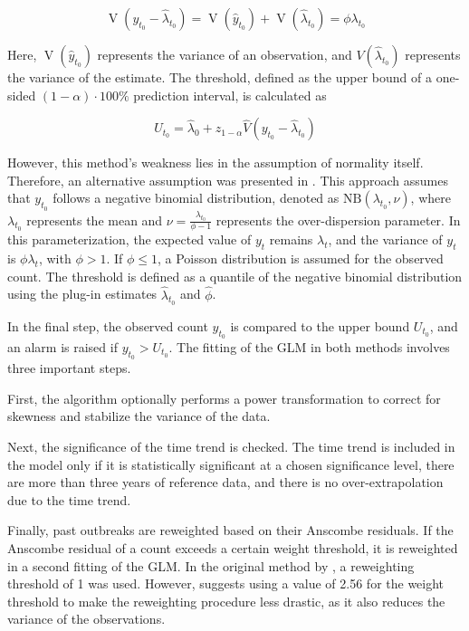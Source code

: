 \documentclass[a4paper,twoside,11pt]{report} %
\DeclareMathOperator{\V}{V}
\theoremstyle{definition}
\theoremstyle{definition}
\theoremstyle{definition}
\theoremstyle{definition}
\theoremstyle{remark}
\begin{document}
\begin{equation}
\V(y_{t_0}-\hat{\lambda}_{t_0}) = \V(\hat{y}_{t_0}) + \V(\hat{\lambda}_{t_0}) = \phi\lambda_{t_0}
\end{equation}

Here, \(\V(\hat{y}_{t_0})\) represents the variance of an observation, and \(V(\hat{\lambda}_{t_0})\) represents the variance of the estimate. The threshold, defined as the upper bound of a one-sided \((1-\alpha)\cdot100\%\) prediction interval, is calculated as

\begin{equation}
U_{t_0} = \hat{\lambda}_{0} + z_{1-\alpha}\hat{V}(y_{t_0}-\hat{\lambda}_{t_0})
\end{equation}

However, this method's weakness lies in the assumption of normality itself. Therefore, an alternative assumption was presented in \textcite{Noufaily_2013}. This approach assumes that \(y_{t_0}\) follows a negative binomial distribution, denoted as \(\text{NB}(\lambda_{t_0}, \nu)\), where \(\lambda_{t_0}\) represents the mean and \(\nu = \frac{\lambda_{t_0}}{\phi-1}\) represents the over-dispersion parameter. In this parameterization, the expected value of \(y_t\) remains \(\lambda_t\), and the variance of \(y_t\) is \(\phi\lambda_t\), with \(\phi > 1\). If \(\phi \leq 1\), a Poisson distribution is assumed for the observed count. The threshold is defined as a quantile of the negative binomial distribution using the plug-in estimates \(\hat{\lambda}_{t_0}\) and \(\hat{\phi}\).

In the final step, the observed count \(y_{t_0}\) is compared to the upper bound \(U_{t_0}\), and an alarm is raised if \(y_{t_0} > U_{t_0}\). The fitting of the GLM in both methods involves three important steps.

First, the algorithm optionally performs a power transformation to correct for skewness and stabilize the variance of the data.

Next, the significance of the time trend is checked. The time trend is included in the model only if it is statistically significant at a chosen significance level, there are more than three years of reference data, and there is no over-extrapolation due to the time trend.

Finally, past outbreaks are reweighted based on their Anscombe residuals. If the Anscombe residual of a count exceeds a certain weight threshold, it is reweighted in a second fitting of the GLM. In the original method by \textcite{Farrington_1996}, a reweighting threshold of 1 was used. However, \textcite{Noufaily_2013} suggests using a value of 2.56 for the weight threshold to make the reweighting procedure less drastic, as it also reduces the variance of the observations.
\end{document}
